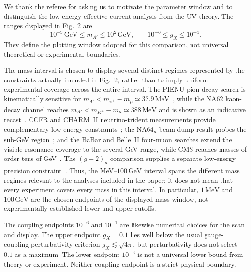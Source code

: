 \documentclass[12pt,a4paper]{article}
\begin{document}
We thank the referee for asking us to motivate the parameter window and to distinguish the low-energy effective-current analysis from the UV theory. The ranges displayed in Fig.~2 are
\[
10^{-3}\,\mathrm{GeV}\leq m_{A'}\leq10^2\,\mathrm{GeV},
\qquad
10^{-6}\leq g_X\leq10^{-1}.
\]
They define the plotting window adopted for this comparison, not universal theoretical or experimental boundaries.

The mass interval is chosen to display several distinct regimes represented by the constraints actually included in Fig.~2, rather than to imply uniform experimental coverage across the entire interval. The PIENU pion-decay search is kinematically sensitive for \(m_{A'}<m_{\pi^+}-m_\mu\simeq33.9\,\mathrm{MeV}\)~\cite{PIENU:2021clt,Altmannshofer:2026opc}, while the NA62 kaon-decay channel reaches \(m_{A'}<m_{K^+}-m_\mu\simeq388\,\mathrm{MeV}\) and is shown as an indicative recast~\cite{NA62:2021bji}. CCFR and CHARM~II neutrino-trident measurements provide complementary low-energy constraints~\cite{CCFR:1991lpl,geiregat1990first}; the NA64\(_\mu\) beam-dump result probes the sub-GeV region~\cite{NA64:2024nwj}; and the BaBar and Belle~II four-muon searches extend the visible-resonance coverage to the several-GeV range, while CMS reaches masses of order tens of GeV~\cite{BaBar:2016sci,Belle-II:2024wtd,CMS:2018yxg}. The \((g-2)_\mu\) comparison supplies a separate low-energy precision constraint~\cite{Muong-2:2025xyk}. Thus, the MeV--\(100\,\mathrm{GeV}\) interval spans the different mass regimes relevant to the analyses included in the paper; it does not mean that every experiment covers every mass in this interval. In particular, \(1\,\mathrm{MeV}\) and \(100\,\mathrm{GeV}\) are the chosen endpoints of the displayed mass window, not experimentally established lower and upper cutoffs.

The coupling endpoints \(10^{-6}\) and \(10^{-1}\) are likewise numerical choices for the scan and display. The upper endpoint \(g_X=0.1\) lies well below the usual gauge-coupling perturbativity criterion \(g_X\lesssim\sqrt{4\pi}\), but perturbativity does not select \(0.1\) as a maximum. The lower endpoint \(10^{-6}\) is not a universal lower bound from theory or experiment. Neither coupling endpoint is a strict physical boundary.
\end{document}
